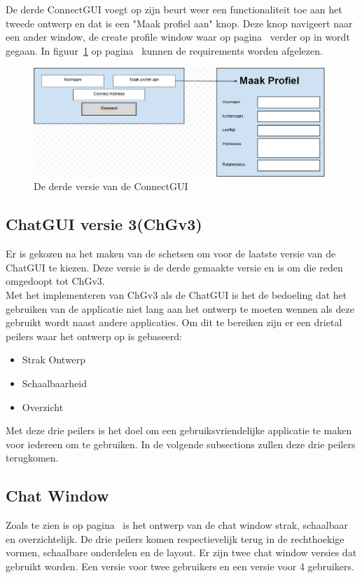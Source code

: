 \documentclass[12pt]{article}
\begin{document}
\noindent De derde ConnectGUI voegt op zijn beurt weer een functionaliteit toe aan het tweede ontwerp en dat is een "Maak profiel aan" knop. Deze knop navigeert naar een ander window, de create profile window waar op pagina~\pageref{CPW} verder op in wordt gegaan. In figuur~\ref{figure006} op pagina~\pageref{figure006} kunnen de requirements worden afgelezen.
\begin{figure}[ht]
\begin{center}
\includegraphics[width = 110mm]{CGDv3}
\caption{De derde versie van de ConnectGUI}
\label{figure006}
\end{center}
\end{figure}

\subsection{ChatGUI versie 3(ChGv3)}
\label{ChatGUI}
Er is gekozen na het maken van de schetsen om voor de laatste versie van de ChatGUI te kiezen. Deze versie is de derde gemaakte versie en is om die reden omgedoopt tot ChGv3. \\

\noindent Met het implementeren van ChGv3 als de ChatGUI is het de bedoeling dat het gebruiken van de applicatie niet lang aan het ontwerp te moeten wennen als deze gebruikt wordt naast andere applicaties. Om dit te bereiken zijn er een drietal peilers waar het ontwerp op is gebaseerd:
\begin{itemize}
\item{Strak Ontwerp}
\item{Schaalbaarheid}
\item{Overzicht}
\end{itemize}
Met deze drie peilers is het doel om een gebruiksvriendelijke applicatie te maken voor iedereen om te gebruiken. In de volgende subsections zullen deze drie peilers terugkomen.

\subsection*{Chat Window}
\label{Chat Window}
Zoals te zien is op pagina~\pageref{ChGv3Chat} is het ontwerp van de chat window strak, schaalbaar en overzichtelijk. De drie peilers komen respectievelijk terug in de rechthoekige vormen, schaalbare onderdelen en de layout. Er zijn twee chat window versies dat gebruikt worden. Een versie voor twee gebruikers en een versie voor 4 gebruikers.\\
\end{document}
